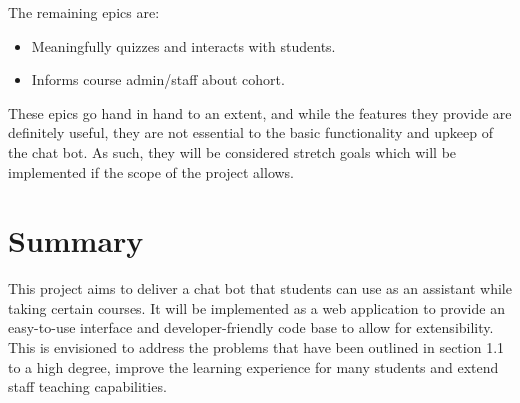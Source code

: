 \documentclass{article}
\begin{document}
The remaining epics are:
\begin{itemize}
  \item Meaningfully quizzes and interacts with students.
  \item Informs course admin/staff about cohort.
\end{itemize}

These epics go hand in hand to an extent, and while the features they provide are definitely useful, they are not essential to the basic functionality and upkeep of the chat bot. As such, they will be considered stretch goals which will be implemented if the scope of the project allows.


\section{Summary}

This project aims to deliver a chat bot that students can use as an assistant while taking certain courses. It will be implemented as a web application to provide an easy-to-use interface and developer-friendly code base to allow for extensibility. This is envisioned to address the problems that have been outlined in section 1.1 to a high degree, improve the learning experience for many students and extend staff teaching capabilities.
\end{document}
